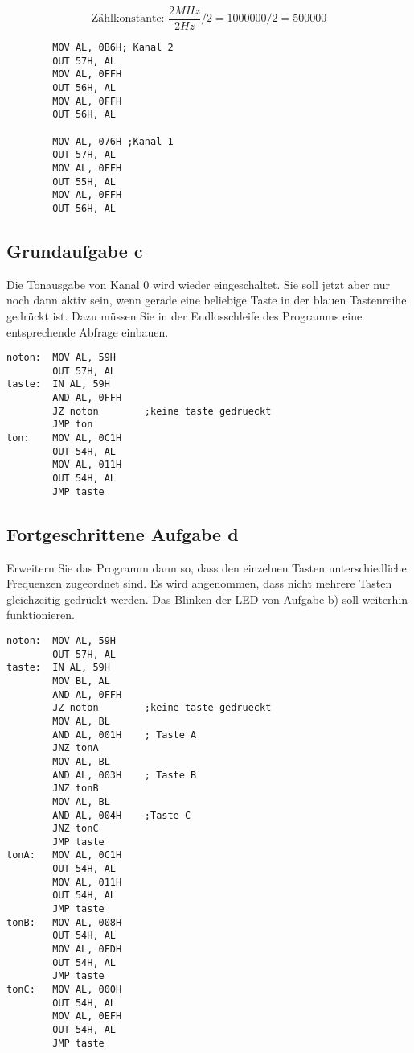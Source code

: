 \documentclass[a4paper,12pt,titlepage]{scrartcl}
\begin{document}
$$\text{Zählkonstante: } \frac{2 MHz}{2 Hz} /2 = 1000000 / 2 = 500000$$
\begin{lstlisting}
        MOV AL, 0B6H; Kanal 2
        OUT 57H, AL
        MOV AL, 0FFH
        OUT 56H, AL
        MOV AL, 0FFH
        OUT 56H, AL

        MOV AL, 076H ;Kanal 1
        OUT 57H, AL
        MOV AL, 0FFH
        OUT 55H, AL
        MOV AL, 0FFH
        OUT 56H, AL

\end{lstlisting}

\subsection*{Grundaufgabe c}
Die Tonausgabe von Kanal 0 wird wieder eingeschaltet. Sie soll jetzt aber nur noch dann aktiv sein, wenn gerade eine beliebige Taste in der blauen Tastenreihe gedrückt ist. Dazu müssen Sie in der Endlosschleife des Programms eine entsprechende Abfrage einbauen.

\begin{lstlisting}
noton:  MOV AL, 59H
        OUT 57H, AL
taste:  IN AL, 59H
        AND AL, 0FFH
        JZ noton        ;keine taste gedrueckt
        JMP ton
ton:    MOV AL, 0C1H
        OUT 54H, AL
        MOV AL, 011H
        OUT 54H, AL
        JMP taste
\end{lstlisting}

\subsection*{Fortgeschrittene Aufgabe d}
Erweitern Sie das Programm dann so, dass den einzelnen Tasten unterschiedliche Frequenzen zugeordnet sind. Es wird angenommen, dass nicht mehrere Tasten gleichzeitig gedrückt werden. Das  Blinken  der  LED  von  Aufgabe  b)  soll  weiterhin  funktionieren.

\begin{lstlisting}
noton:  MOV AL, 59H
        OUT 57H, AL
taste:  IN AL, 59H
        MOV BL, AL
        AND AL, 0FFH
        JZ noton        ;keine taste gedrueckt
        MOV AL, BL
        AND AL, 001H    ; Taste A
        JNZ tonA
        MOV AL, BL
        AND AL, 003H    ; Taste B
        JNZ tonB
        MOV AL, BL
        AND AL, 004H    ;Taste C
        JNZ tonC
        JMP taste
tonA:   MOV AL, 0C1H
        OUT 54H, AL
        MOV AL, 011H
        OUT 54H, AL
        JMP taste
tonB:   MOV AL, 008H
        OUT 54H, AL
        MOV AL, 0FDH
        OUT 54H, AL
        JMP taste
tonC:   MOV AL, 000H
        OUT 54H, AL
        MOV AL, 0EFH
        OUT 54H, AL
        JMP taste
\end{lstlisting}
\end{document}

